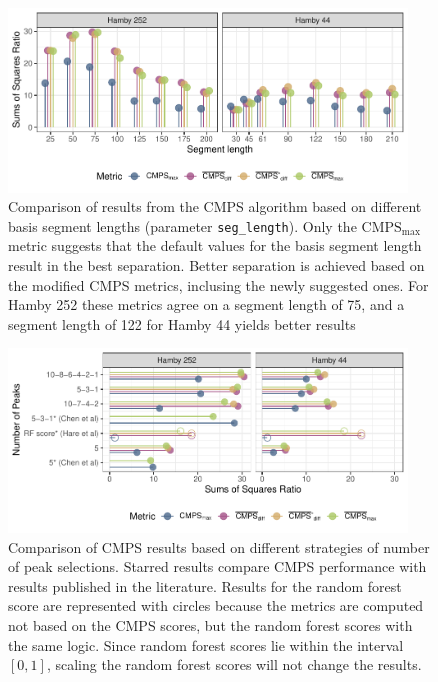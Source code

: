 \begin{Schunk}
\begin{figure}

{\centering \includegraphics[width=400px]{ju-hofmann_files/figure-latex/param_seg_plot-1} 

}

\caption{Comparison of results from the CMPS algorithm based on different basis segment lengths (parameter \texttt{seg\_length}). Only the $\mathrm{CMPS_{max}}$ metric suggests that the default values for the basis segment length result in the best separation. Better separation is achieved based on the modified CMPS metrics, inclusing the newly suggested ones. For Hamby 252 these metrics agree on a segment length of 75, and a segment length of 122 for Hamby 44 yields better results}\label{fig:param_seg_plot}
\end{figure}
\end{Schunk}

\begin{Schunk}
\begin{figure}

{\centering \includegraphics[width=400px]{ju-hofmann_files/figure-latex/param_npeak_plot-1} 

}

\caption[Comparison of CMPS results based on different strategies of number of peak selections]{Comparison of CMPS results based on different strategies of number of peak selections. Starred results compare CMPS performance with results published in the literature. Results for the random forest score are represented with circles because the metrics are computed not based on the CMPS scores, but the random forest scores with the same logic. Since random forest scores lie within the interval $[0, 1]$, scaling the random forest scores will not change the results.}\label{fig:param_npeak_plot}
\end{figure}
\end{Schunk}

